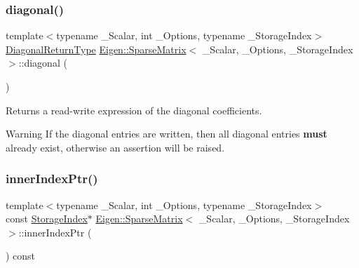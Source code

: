 \subsubsection{\texorpdfstring{diagonal()}{diagonal()}\hspace{0.1cm}{\footnotesize\ttfamily [2/2]}}
{\footnotesize\ttfamily template$<$typename \+\_\+\+Scalar, int \+\_\+\+Options, typename \+\_\+\+Storage\+Index$>$ \\
\mbox{\hyperlink{class_eigen_1_1_diagonal}{Diagonal\+Return\+Type}} \mbox{\hyperlink{class_eigen_1_1_sparse_matrix}{Eigen\+::\+Sparse\+Matrix}}$<$ \+\_\+\+Scalar, \+\_\+\+Options, \+\_\+\+Storage\+Index $>$\+::diagonal (\begin{DoxyParamCaption}{ }\end{DoxyParamCaption})\hspace{0.3cm}{\ttfamily [inline]}}

\begin{DoxyReturn}{Returns}
a read-\/write expression of the diagonal coefficients. 
\end{DoxyReturn}
\begin{DoxyWarning}{Warning}
If the diagonal entries are written, then all diagonal entries {\bfseries{must}} already exist, otherwise an assertion will be raised. 
\end{DoxyWarning}
\mbox{\label{class_eigen_1_1_sparse_matrix_ae7b804bd39745156d20ca1611a296b67}} 
\subsubsection{\texorpdfstring{innerIndexPtr()}{innerIndexPtr()}\hspace{0.1cm}{\footnotesize\ttfamily [1/2]}}
{\footnotesize\ttfamily template$<$typename \+\_\+\+Scalar, int \+\_\+\+Options, typename \+\_\+\+Storage\+Index$>$ \\
const \mbox{\hyperlink{class_eigen_1_1_sparse_matrix_base_a0b540ba724726ebe953f8c0df06081ed}{Storage\+Index}}$\ast$ \mbox{\hyperlink{class_eigen_1_1_sparse_matrix}{Eigen\+::\+Sparse\+Matrix}}$<$ \+\_\+\+Scalar, \+\_\+\+Options, \+\_\+\+Storage\+Index $>$\+::inner\+Index\+Ptr (\begin{DoxyParamCaption}{ }\end{DoxyParamCaption}) const\hspace{0.3cm}{\ttfamily [inline]}}

